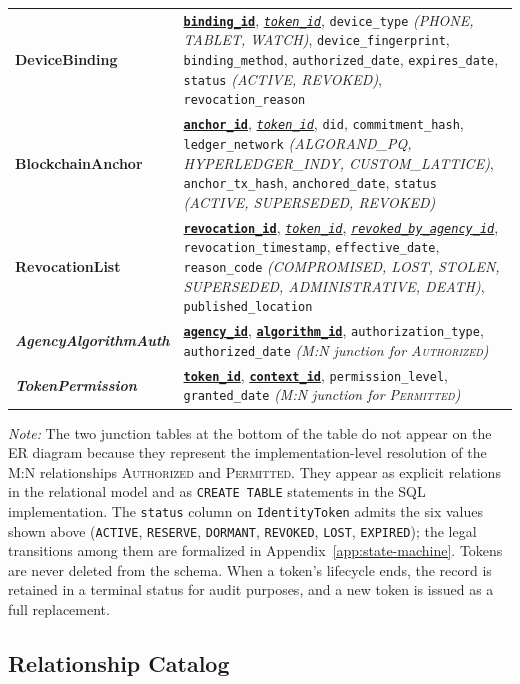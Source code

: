 \documentclass[11pt,letterpaper]{article}
\newcommand{\entity}[1]{\texttt{\color{navydark}#1}}
\newcommand{\pk}[1]{\underline{\textbf{\texttt{#1}}}}
\newcommand{\fk}[1]{\underline{\textit{\texttt{#1}}}}
\begin{document}
\begin{table}[H]
\begin{tabularx}{\textwidth}{>{\bfseries}p{1.62in} >{\RaggedRight\arraybackslash}X}
DeviceBinding & \pk{binding\_id}, \fk{token\_id}, \texttt{device\_type} \textit{(PHONE, TABLET, WATCH)}, \texttt{device\_fingerprint}, \texttt{binding\_method}, \texttt{authorized\_date}, \texttt{expires\_date}, \texttt{status} \textit{(ACTIVE, REVOKED)}, \texttt{revocation\_reason} \\
BlockchainAnchor & \pk{anchor\_id}, \fk{token\_id}, \texttt{did}, \texttt{commitment\_hash}, \texttt{ledger\_network} \textit{(ALGORAND\_PQ, HYPERLEDGER\_INDY, CUSTOM\_LATTICE)}, \texttt{anchor\_tx\_hash}, \texttt{anchored\_date}, \texttt{status} \textit{(ACTIVE, SUPERSEDED, REVOKED)} \\
RevocationList & \pk{revocation\_id}, \fk{token\_id}, \fk{revoked\_by\_agency\_id}, \texttt{revocation\_timestamp}, \texttt{effective\_date}, \texttt{reason\_code} \textit{(COMPROMISED, LOST, STOLEN, SUPERSEDED, ADMINISTRATIVE, DEATH)}, \texttt{published\_location} \\
\midrule
\rowcolor{tabstripe}
\textit{AgencyAlgorithmAuth} & \pk{agency\_id}, \pk{algorithm\_id}, \texttt{authorization\_type}, \texttt{authorized\_date} \textit{(M:N junction for \textsc{Authorized})} \\
\textit{TokenPermission} & \pk{token\_id}, \pk{context\_id}, \texttt{permission\_level}, \texttt{granted\_date} \textit{(M:N junction for \textsc{Permitted})} \\
\bottomrule
\end{tabularx}
\end{table}

\textit{Note:} The two junction tables at the bottom of the table do not appear on the ER diagram because they represent the implementation-level resolution of the M:N relationships \textsc{Authorized} and \textsc{Permitted}. They appear as explicit relations in the relational model and as \texttt{CREATE TABLE} statements in the SQL implementation. The \texttt{status} column on \entity{IdentityToken} admits the six values shown above (\texttt{ACTIVE}, \texttt{RESERVE}, \texttt{DORMANT}, \texttt{REVOKED}, \texttt{LOST}, \texttt{EXPIRED}); the legal transitions among them are formalized in Appendix~\ref{app:state-machine}. Tokens are never deleted from the schema. When a token's lifecycle ends, the record is retained in a terminal status for audit purposes, and a new token is issued as a full replacement.

\subsection{Relationship Catalog}
\end{document}
